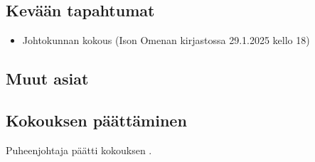 \documentclass[a4paper,12pt]{article}
\begin{document}
\subsection{Kevään tapahtumat}
\begin{itemize}
\item{Johtokunnan kokous} (Ison Omenan kirjastossa 29.1.2025 kello 18)
\end{itemize}
\subsection{Muut asiat}
\subsection{Kokouksen päättäminen}
Puheenjohtaja päätti kokouksen .
\end{document}
